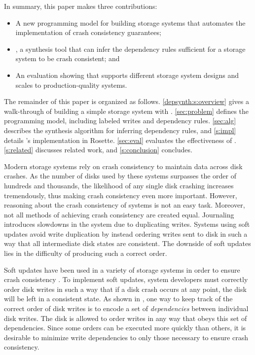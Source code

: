 In summary, this paper makes three contributions:
\begin{itemize}
\item A new programming model for building storage systems that automates the implementation of crash consistency guarantees;
\item \depsynth, a synthesis tool that can infer the dependency rules sufficient for a storage system to be crash consistent; and
\item An evaluation showing that \depsynth supports different storage system designs and scales to production-quality systems.
\end{itemize}

\noindent
The remainder of this paper is organized as follows.
\cref{depsynth:s:overview} gives a walk-through of building a simple storage system with \depsynth.
\cref{sec:problem} defines the \depsynth programming model, including labeled writes and dependency rules.
\cref{sec:alg} describes the \depsynth synthesis algorithm for inferring dependency rules,
and \cref{s:impl} details \depsynth's implementation in Rosette.
\cref{sec:eval} evaluates the effectiveness of \depsynth.
\cref{s:related} discusses related work, and \cref{s:conclusion} concludes.\tighten

Modern storage systems rely on crash consistency to maintain data across disk crashes.
As the number of disks used by these systems surpasses the order of hundreds and thousands,
the likelihood of any single disk crashing increases tremendously, thus making crash
consistency even more important. However, reasoning about the crash consistency of systems
is not an easy task. Moreover, not all methods of achieving crash consistency are created equal.
Journaling introduces slowdowns in the system due to duplicating writes.
Systems using soft updates avoid write duplication by instead
ordering writes sent to disk in such a way that all intermediate disk states are consistent.
The downside of soft updates lies in the difficulty of producing such a correct order.

Soft updates have been used in a variety of storage systems in
order to ensure crash consistency . To implement soft updates, system
developers must correctly order disk writes in such a way that if a disk crash occurs
at any point, the disk will be left in a consistent state. As shown in ,
one way to keep track of the correct order of disk writes is to encode a set of \textit{dependencies}
between individual disk writes. The disk is allowed to order writes in any way that
obeys this set of dependencies.
Since some orders can be executed more quickly than others, it is desirable to minimize
write dependencies to only those necessary to ensure crash consistency.

